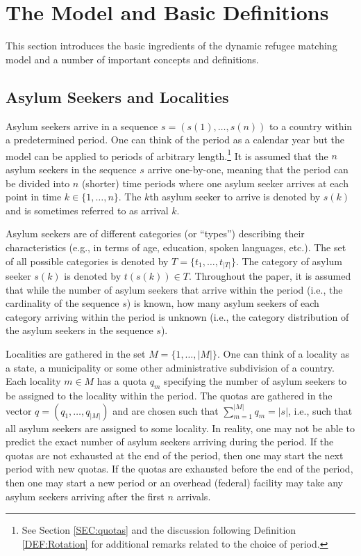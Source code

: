 \documentclass[12pt,fleqn]{article}
\begin{document}
\section{The Model and Basic Definitions}\label{SEC:Model}
This section introduces the basic ingredients of the dynamic refugee matching model and a number of important concepts and definitions.

\subsection{Asylum Seekers and Localities}
Asylum seekers arrive in a sequence $s=(s(1),\ldots,s(n))$ to a country within a predetermined period. One can think of the period as a calendar year but the model can be applied to periods of arbitrary length.\footnote{See Section \ref{SEC:quotas} and the discussion following Definition \ref{DEF:Rotation} for additional remarks related to the choice of period.} It is assumed that the $n$ asylum seekers in the sequence $s$ arrive one-by-one, meaning that the period can be divided into $n$ (shorter) time periods where one asylum seeker arrives at each point in time $k\in\{1,\ldots,n\}$. The $k$th asylum seeker to arrive is denoted by $s(k)$ and is sometimes referred to as arrival $k$.

Asylum seekers are of different categories (or ``types'') describing their characteristics (e.g., in terms of age, education, spoken languages, etc.). The set of all possible categories is denoted by $T=\{t_1,\ldots,t_{|T|}\}$. The category of asylum seeker $s(k)$ is denoted by $t(s(k))\in T$. Throughout the paper, it is assumed that while the number of asylum seekers that arrive within the period (i.e., the cardinality of the sequence $s$) is known, how many asylum seekers of each category arriving within the period is unknown (i.e., the category distribution of the asylum seekers in the sequence $s$).

Localities are gathered in the set $M=\{1,\ldots,|M|\}$. One can think of a locality as a state, a municipality or some other administrative subdivision of a country. Each locality $m\in M$ has a quota $q_m$ specifying the number of asylum seekers
to be assigned to the locality within the period. The quotas are gathered in the vector $q=(q_1,\ldots, q_{|M|})$ and are chosen such that $\sum_{m=1}^{|M|}q_m=|s|$, i.e., such that all asylum seekers are assigned to some locality. In reality, one may not be able to predict the exact number of asylum seekers arriving during the period. If the quotas are not exhausted at the end of the period, then one may start the next period with new quotas. If the quotas are exhausted before the end of the period, then one may start a new period or an overhead (federal) facility may take any asylum seekers arriving after the first $n$ arrivals.
\end{document}
